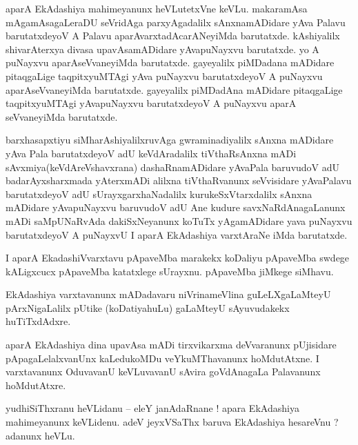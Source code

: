 \documentclass{article}
\begin{document}
\begin{mn}%
aparA EkAdashiya mahimeyanunx heVLutetxVne keVLu. makaramAsa mAgamAsagaLeraDU seVridAga 
parxyAgadalilx sAnxnamADidare yAva Palavu barutatxdeyoV A Palavu aparAvarxtadAcarANeyiMda 
barutatxde. kAshiyalilx shivarAterxya divasa upavAsamADidare yAvapuNayxvu barutatxde. yo A 
puNayxvu aparAseVvaneyiMda barutatxde. gayeyalilx piMDadana mADidare pitaqgaLige taqpitxyuMTAgi 
yAva puNayxvu barutatxdeyoV A puNayxvu aparAseVvaneyiMda barutatxde. gayeyalilx piMDadAna mADidare 
pitaqgaLige taqpitxyuMTAgi yAvapuNayxvu barutatxdeyoV A puNayxvu aparA seVvaneyiMda barutatxde.
\end{mn}

\begin{mn}%
barxhasapxtiyu siMharAshiyalilxruvAga gwraminadiyalilx sAnxna mADidare yAva Pala barutatxdeyoV adU 
keVdAradalilx tiVthaRsAnxna mADi sAvxmiya(keVdAreVshavxrana) dashaRnamADidare yAvaPala baruvudoV 
adU badarAyxsharxmada yAterxmADi alilxna tiVthaRvanunx seVvisidare yAvaPalavu barutatxdeyoV adU 
sUrayxgarxhaNadalilx kurukeSxVtarxdalilx sAnxna mADidare yAvapuNayxvu baruvudoV adU Ane kudure 
savxNaRdAnagaLanunx mADi saMpUNaRvAda dakiSxNeyanunx koTuTx yAgamADidare yava puNayxvu 
barutatxdeyoV A puNayxvU I aparA EkAdashiya varxtAraNe iMda barutatxde.
\end{mn}

\begin{mn}%
I aparA EkadashiVvarxtavu pApaveMba marakekx koDaliyu pApaveMba swdege kALigxcucx pApaveMba 
katatxlege sUrayxnu. pApaveMba jiMkege siMhavu.
\end{mn}

\begin{mn}%
EkAdashiya varxtavanunx mADadavaru niVrinameVlina guLeLXgaLaMteyU pArxNigaLalilx pUtike 
(koDatiyahuLu) gaLaMteyU sAyuvudakekx huTiTxdAdxre.
\end{mn}

\begin{mn}%
aparA EkAdashiya dina upavAsa mADi tirxvikarxma deVvaranunx pUjisidare pApagaLelalxvanUnx 
kaLedukoMDu veYkuMThavanunx hoMdutAtxne. I varxtavanunx OduvavanU keVLuvavanU sAvira goVdAnagaLa 
Palavanunx hoMdutAtxre.
\end{mn}


\begin{mn}%
yudhiSiThxranu heVLidanu -- eleY janAdaRnane ! apara EkAdashiya mahimeyanunx keVLidenu. adeV 
jeyxVSaThx baruva EkAdashiya hesareVnu ? adanunx heVLu.
\end{mn}
\end{document}
